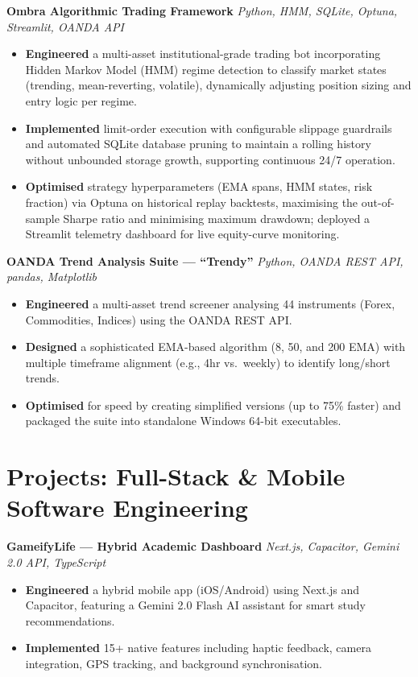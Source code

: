 \documentclass[10pt, a4paper]{article}
\newenvironment{project}[2]{%
  \textbf{\color{accent}#1} \hfill
  \small\textit{\color{light}#2}%
  \begin{itemize}%
}{%
  \end{itemize}%
  \vspace{2pt}%
}
\begin{document}
\begin{project}{Ombra Algorithmic Trading Framework}{Python, HMM, SQLite, Optuna, Streamlit, OANDA API}
  \item \textbf{Engineered} a multi-asset institutional-grade trading bot incorporating Hidden
        Markov Model (HMM) regime detection to classify market states (trending, mean-reverting,
        volatile), dynamically adjusting position sizing and entry logic per regime.
  \item \textbf{Implemented} limit-order execution with configurable slippage guardrails and
        automated SQLite database pruning to maintain a rolling history without unbounded
        storage growth, supporting continuous 24/7 operation.
  \item \textbf{Optimised} strategy hyperparameters (EMA spans, HMM states, risk fraction) via
        Optuna on historical replay backtests, maximising the out-of-sample Sharpe ratio and
        minimising maximum drawdown; deployed a Streamlit telemetry dashboard for live
        equity-curve monitoring.
\end{project}

\begin{project}{OANDA Trend Analysis Suite --- ``Trendy''}{Python, OANDA REST API, pandas, Matplotlib}
  \item \textbf{Engineered} a multi-asset trend screener analysing 44 instruments (Forex, Commodities, Indices) using the OANDA REST API.
  \item \textbf{Designed} a sophisticated EMA-based algorithm (8, 50, and 200 EMA) with multiple timeframe alignment (e.g., 4hr vs.\ weekly) to identify long/short trends.
  \item \textbf{Optimised} for speed by creating simplified versions (up to 75\% faster) and packaged the suite into standalone Windows 64-bit executables.
\end{project}

\section{Projects: Full-Stack \& Mobile Software Engineering}

\begin{project}{GameifyLife --- Hybrid Academic Dashboard}{Next.js, Capacitor, Gemini 2.0 API, TypeScript}
  \item \textbf{Engineered} a hybrid mobile app (iOS/Android) using Next.js and Capacitor, featuring a Gemini 2.0 Flash AI assistant for smart study recommendations.
  \item \textbf{Implemented} 15+ native features including haptic feedback, camera integration, GPS tracking, and background synchronisation.
\end{project}
\end{document}
